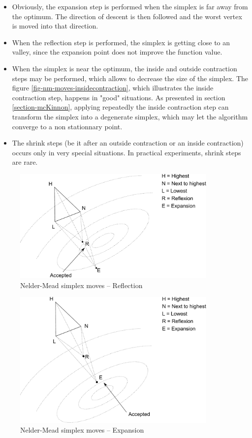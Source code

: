 \begin{itemize}
\item Obviously, the expansion step is performed when the 
simplex is far away from the optimum. The direction of 
descent is then followed and the worst vertex is moved 
into that direction.
\item When the reflection step is performed, the simplex is 
getting close to an valley, since the expansion point 
does not improve the function value.
\item When the simplex is near the optimum, 
the inside and outside contraction steps may be performed, which 
allows to decrease the size of the simplex.
The figure \ref{fig-nm-moves-insidecontraction}, which illustrates 
the inside contraction step, happens in "good" situations.
As presented in section \ref{section-mcKinnon}, applying 
repeatedly the inside contraction step can transform 
the simplex into a degenerate simplex, which may let the algorithm
converge to a non stationnary point.
\item The shrink steps (be it after an outside contraction or an inside 
contraction) occurs only in very special situations. In practical experiments,
shrink steps are rare.
\end{itemize}

\begin{figure}
\begin{center}
\includegraphics[width=10cm]{neldermeadmethod/nelder-mead-reflection.pdf}
\end{center}
\caption{Nelder-Mead simplex moves -- Reflection}
\label{fig-nm-moves-reflection}
\end{figure}

\begin{figure}
\begin{center}
\includegraphics[width=10cm]{neldermeadmethod/nelder-mead-extension.pdf}
\end{center}
\caption{Nelder-Mead simplex moves -- Expansion}
\label{fig-nm-moves-expansion}
\end{figure}

